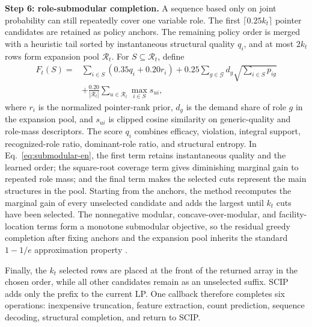 \documentclass[final,5p,times,twocolumn]{elsarticle}
\begin{document}
\noindent\textbf{Step 6: role-submodular completion.} A sequence based only on joint probability can still repeatedly cover one variable role. The first $\lceil0.25k_t\rceil$ pointer candidates are retained as policy anchors. The remaining policy order is merged with a heuristic tail sorted by instantaneous structural quality $q_i$, and at most $2k_t$ rows form expansion pool $\mathcal R_t$. For $S\subseteq\mathcal R_t$, define
\begin{equation}
\begin{aligned}
F_t(S)={}&\sum_{i\in S}(0.35q_i+0.20r_i)
+0.25\sum_{g\in\mathcal G}d_g\sqrt{\sum_{i\in S}p_{ig}}\\
&+\frac{0.20}{|\mathcal R_t|}\sum_{u\in\mathcal R_t}\max_{i\in S}s_{ui},
\end{aligned}
\label{eq:submodular-en}
\end{equation}
where $r_i$ is the normalized pointer-rank prior, $d_g$ is the demand share of role $g$ in the expansion pool, and $s_{ui}$ is clipped cosine similarity on generic-quality and role-mass descriptors. The score $q_i$ combines efficacy, violation, integral support, recognized-role ratio, dominant-role ratio, and structural entropy. In Eq.~\eqref{eq:submodular-en}, the first term retains instantaneous quality and the learned order; the square-root coverage term gives diminishing marginal gain to repeated role mass; and the final term makes the selected cuts represent the main structures in the pool. Starting from the anchors, the method recomputes the marginal gain of every unselected candidate and adds the largest until $k_t$ cuts have been selected. The nonnegative modular, concave-over-modular, and facility-location terms form a monotone submodular objective, so the residual greedy completion after fixing anchors and the expansion pool inherits the standard $1-1/e$ approximation property \citep{nemhauser1978analysis}.

Finally, the $k_t$ selected rows are placed at the front of the returned array in the chosen order, while all other candidates remain as an unselected suffix. SCIP adds only the prefix to the current LP. One callback therefore completes six operations: inexpensive truncation, feature extraction, count prediction, sequence decoding, structural completion, and return to SCIP.
\end{document}
